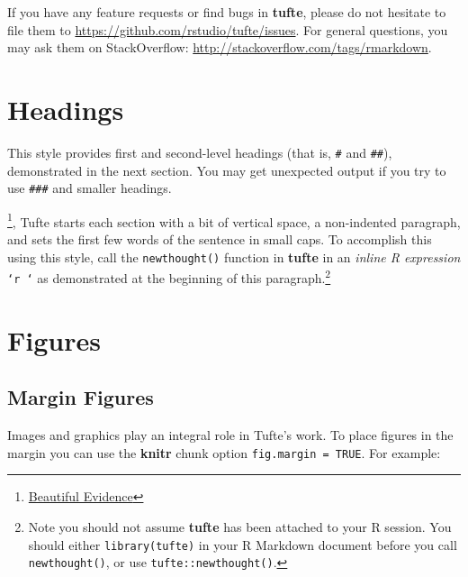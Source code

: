 \documentclass[]{tufte-handout}
\newenvironment{Shaded}{}{}
\newcommand{\KeywordTok}[1]{\textcolor[rgb]{0.00,0.44,0.13}{\textbf{{#1}}}}
\newcommand{\DataTypeTok}[1]{\textcolor[rgb]{0.56,0.13,0.00}{{#1}}}
\newcommand{\StringTok}[1]{\textcolor[rgb]{0.25,0.44,0.63}{{#1}}}
\newcommand{\NormalTok}[1]{{#1}}
\begin{document}
If you have any feature requests or find bugs in \textbf{tufte}, please
do not hesitate to file them to
\url{https://github.com/rstudio/tufte/issues}. For general questions,
you may ask them on StackOverflow:
\url{http://stackoverflow.com/tags/rmarkdown}.

\section{Headings}\label{headings}

This style provides first and second-level headings (that is,
\texttt{\#} and \texttt{\#\#}), demonstrated in the next section. You
may get unexpected output if you try to use \texttt{\#\#\#} and smaller
headings.

\footnote{\href{http://www.edwardtufte.com/tufte/books_be}{Beautiful
  Evidence}}, Tufte starts each section with a bit of vertical space, a
non-indented paragraph, and sets the first few words of the sentence in
small caps. To accomplish this using this style, call the
\texttt{newthought()} function in \textbf{tufte} in an \emph{inline R
expression} \texttt{`r `} as demonstrated at the beginning of this
paragraph.\footnote{Note you should not assume \textbf{tufte} has been
  attached to your R session. You should either \texttt{library(tufte)}
  in your R Markdown document before you call \texttt{newthought()}, or
  use \texttt{tufte::newthought()}.}

\section{Figures}\label{figures}

\subsection{Margin Figures}\label{margin-figures}

Images and graphics play an integral role in Tufte's work. To place
figures in the margin you can use the \textbf{knitr} chunk option
\texttt{fig.margin = TRUE}. For example:

\begin{Shaded}
\end{Shaded}
\end{document}
